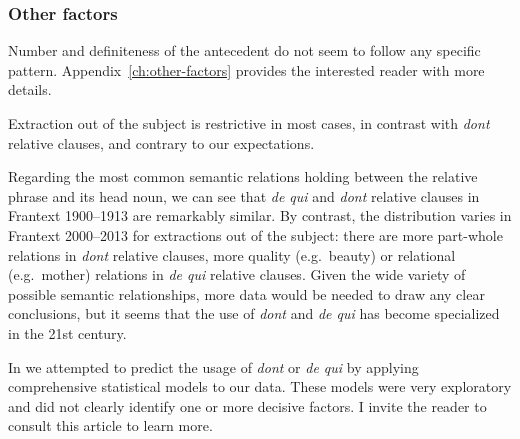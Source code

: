 \subsubsection{Other factors}

Number and definiteness of the antecedent do not seem to follow any specific pattern. Appendix~\ref{ch:other-factors} provides the interested reader with more details. 

Extraction out of the subject is restrictive in most cases, in contrast with \emph{dont} relative clauses, and contrary to our expectations.

Regarding the most common semantic relations holding between the relative phrase and its head noun, we can see that \emph{de qui} and \emph{dont} relative clauses in Frantext 1900--1913 are remarkably similar. By contrast, the distribution varies in Frantext 2000--2013 for extractions out of the subject: there are more part-whole relations in \emph{dont} relative clauses, more quality (e.g.\ beauty) or relational (e.g.\ mother) relations in \emph{de qui} relative clauses. Given the wide variety of possible semantic relationships, more data would be needed to draw any clear conclusions, but it seems that the use of \emph{dont} and \emph{de qui} has become specialized in the 21st century. 

In \citet{Abeille.2020.JFLS} we attempted to predict the usage of \emph{dont} or \emph{de qui} by applying comprehensive statistical models to our data. 
These models were very exploratory and did not clearly identify one or more decisive factors. I invite the reader to consult this article to learn more. 
